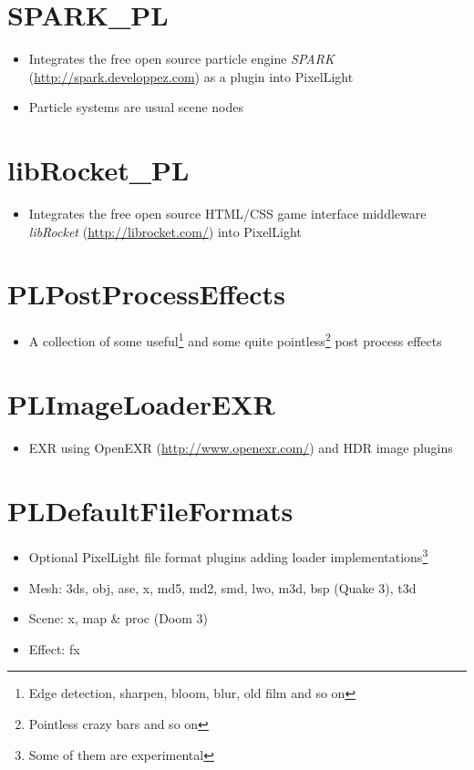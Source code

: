 \section{SPARK\_PL}
\begin{itemize}
\item{Integrates the free open source particle engine \emph{SPARK} (\url{http://spark.developpez.com}) as a plugin into PixelLight}
\item{Particle systems are usual scene nodes}
\end{itemize}




\section{libRocket\_PL}
\begin{itemize}
\item{Integrates the free open source HTML/CSS game interface middleware \emph{libRocket} (\url{http://librocket.com/}) into PixelLight}
\end{itemize}




\section{PLPostProcessEffects}
\begin{itemize}
\item{A collection of some useful\footnote{Edge detection, sharpen, bloom, blur, old film and so on} and some quite pointless\footnote{Pointless crazy bars and so on} post process effects}
\end{itemize}




\section{PLImageLoaderEXR}
\begin{itemize}
\item{EXR using OpenEXR (\url{http://www.openexr.com/}) and HDR image plugins}
\end{itemize}




\section{PLDefaultFileFormats}
\begin{itemize}
\item{Optional PixelLight file format plugins adding loader implementations\footnote{Some of them are experimental}}
\item{Mesh: 3ds, obj, ase, x, md5, md2, smd, lwo, m3d, bsp (Quake 3), t3d}
\item{Scene: x, map \& proc (Doom 3)}
\item{Effect: fx}
\end{itemize}




